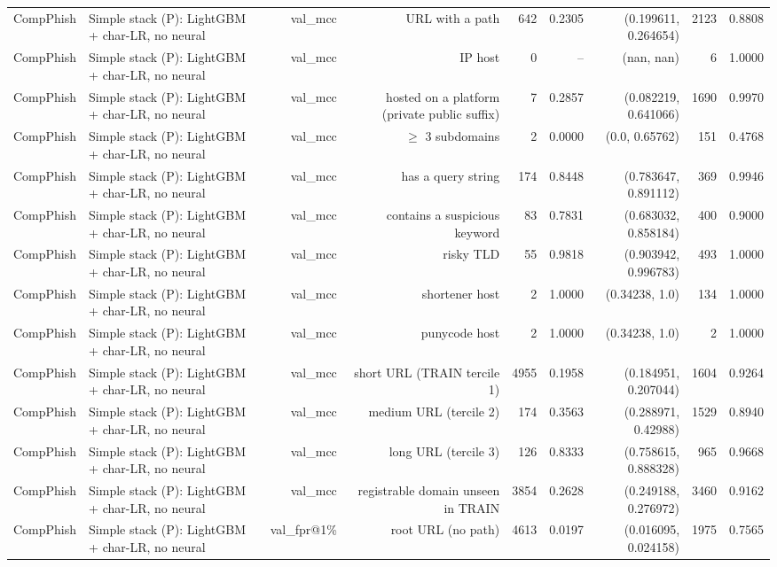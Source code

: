 \begin{table}[t]
\begin{tabular}{llrrrrrrr}
CompPhish & Simple stack (P): LightGBM + char-LR, no neural & val\_mcc & URL with a path & 642 & 0.2305 & (0.199611, 0.264654) & 2123 & 0.8808 \\
CompPhish & Simple stack (P): LightGBM + char-LR, no neural & val\_mcc & IP host & 0 & -- & (nan, nan) & 6 & 1.0000 \\
CompPhish & Simple stack (P): LightGBM + char-LR, no neural & val\_mcc & hosted on a platform (private public suffix) & 7 & 0.2857 & (0.082219, 0.641066) & 1690 & 0.9970 \\
CompPhish & Simple stack (P): LightGBM + char-LR, no neural & val\_mcc & $\geq$ 3 subdomains & 2 & 0.0000 & (0.0, 0.65762) & 151 & 0.4768 \\
CompPhish & Simple stack (P): LightGBM + char-LR, no neural & val\_mcc & has a query string & 174 & 0.8448 & (0.783647, 0.891112) & 369 & 0.9946 \\
CompPhish & Simple stack (P): LightGBM + char-LR, no neural & val\_mcc & contains a suspicious keyword & 83 & 0.7831 & (0.683032, 0.858184) & 400 & 0.9000 \\
CompPhish & Simple stack (P): LightGBM + char-LR, no neural & val\_mcc & risky TLD & 55 & 0.9818 & (0.903942, 0.996783) & 493 & 1.0000 \\
CompPhish & Simple stack (P): LightGBM + char-LR, no neural & val\_mcc & shortener host & 2 & 1.0000 & (0.34238, 1.0) & 134 & 1.0000 \\
CompPhish & Simple stack (P): LightGBM + char-LR, no neural & val\_mcc & punycode host & 2 & 1.0000 & (0.34238, 1.0) & 2 & 1.0000 \\
CompPhish & Simple stack (P): LightGBM + char-LR, no neural & val\_mcc & short URL (TRAIN tercile 1) & 4955 & 0.1958 & (0.184951, 0.207044) & 1604 & 0.9264 \\
CompPhish & Simple stack (P): LightGBM + char-LR, no neural & val\_mcc & medium URL (tercile 2) & 174 & 0.3563 & (0.288971, 0.42988) & 1529 & 0.8940 \\
CompPhish & Simple stack (P): LightGBM + char-LR, no neural & val\_mcc & long URL (tercile 3) & 126 & 0.8333 & (0.758615, 0.888328) & 965 & 0.9668 \\
CompPhish & Simple stack (P): LightGBM + char-LR, no neural & val\_mcc & registrable domain unseen in TRAIN & 3854 & 0.2628 & (0.249188, 0.276972) & 3460 & 0.9162 \\
CompPhish & Simple stack (P): LightGBM + char-LR, no neural & val\_fpr@1\% & root URL (no path) & 4613 & 0.0197 & (0.016095, 0.024158) & 1975 & 0.7565 \\

\end{tabular}
\end{table}
